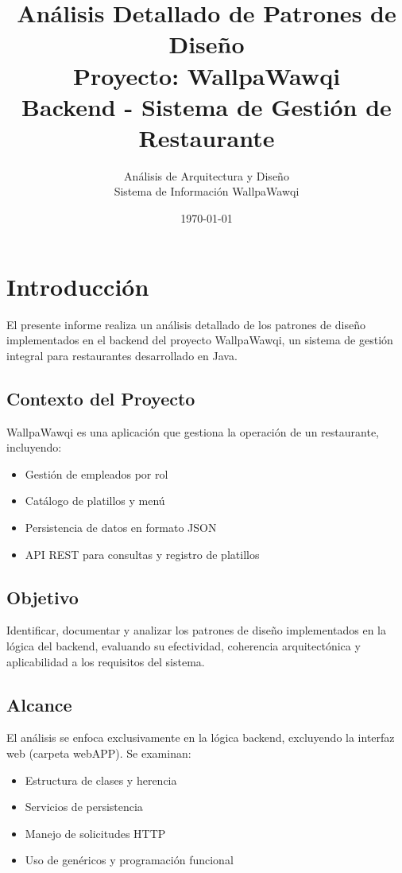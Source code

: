 \documentclass[12pt, a4paper]{report}
\title{
    \vspace*{\fill}
    {\Huge \textbf{Análisis Detallado de Patrones de Diseño}}\\
    \vspace{1cm}
    {\LARGE Proyecto: WallpaWawqi}\\
    \vspace{0.5cm}
    {\large Backend - Sistema de Gestión de Restaurante}
    \vspace*{\fill}
}
\author{
    \Large Análisis de Arquitectura y Diseño\\
    \large Sistema de Información WallpaWawqi
}
\date{\today}
\begin{document}
\maketitle

\newpage
\thispagestyle{empty}
\mbox{}

\newpage
\tableofcontents

\chapter{Introducción}

El presente informe realiza un análisis detallado de los patrones de diseño implementados en el backend del proyecto WallpaWawqi, un sistema de gestión integral para restaurantes desarrollado en Java.

\section{Contexto del Proyecto}

WallpaWawqi es una aplicación que gestiona la operación de un restaurante, incluyendo:
\begin{itemize}
    \item Gestión de empleados por rol
    \item Catálogo de platillos y menú
    \item Persistencia de datos en formato JSON
    \item API REST para consultas y registro de platillos
\end{itemize}

\section{Objetivo}

Identificar, documentar y analizar los patrones de diseño implementados en la lógica del backend, evaluando su efectividad, coherencia arquitectónica y aplicabilidad a los requisitos del sistema.

\section{Alcance}

El análisis se enfoca exclusivamente en la lógica backend, excluyendo la interfaz web (carpeta webAPP). Se examinan:
\begin{itemize}
    \item Estructura de clases y herencia
    \item Servicios de persistencia
    \item Manejo de solicitudes HTTP
    \item Uso de genéricos y programación funcional
\end{itemize}
\end{document}
